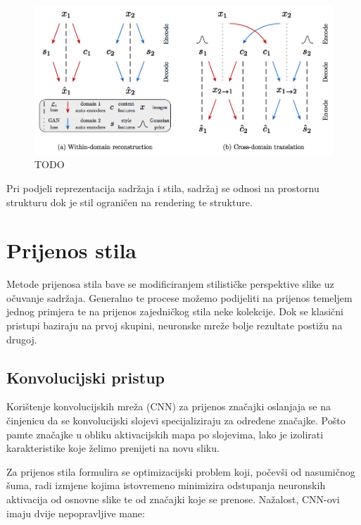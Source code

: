 \documentclass[lmodern, utf8, seminar]{fer}
\begin{document}
\begin{figure}[H]
    \centering
    \includegraphics[width=1\textwidth]{huang2018multimodal-munit}
    \caption{ TODO }
    \label{fig:huang2018multimodal-munit}
\end{figure}


Pri podjeli reprezentacija sadržaja i stila, sadržaj se odnosi na prostornu strukturu dok je stil ograničen na rendering te strukture.




\chapter{Prijenos stila}
Metode prijenosa stila bave se modificiranjem stilističke perspektive slike uz očuvanje sadržaja. Generalno te procese možemo podijeliti na prijenos temeljem jednog primjera te na prijenos zajedničkog stila neke kolekcije. Dok se klasični pristupi baziraju na prvoj skupini, neuronske mreže bolje rezultate postižu na drugoj. 

\section{Konvolucijski pristup}
Korištenje konvolucijskih mreža (CNN) za prijenos značajki oslanjaja se na činjenicu da se konvolucijski slojevi specijaliziraju za određene značajke. Pošto pamte značajke u obliku aktivacijskih mapa po slojevima, lako je izolirati karakteristike koje želimo prenijeti na novu sliku. 

Za prijenos stila formulira se optimizacijski problem koji, počevši od nasumičnog šuma, radi izmjene kojima istovremeno minimizira odstupanja neuronskih aktivacija od osnovne slike te od značajki koje se prenose. Nažalost, CNN-ovi imaju dvije nepopravljive mane:
\end{document}

